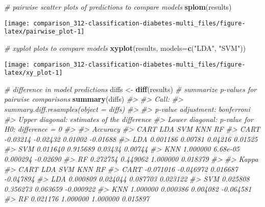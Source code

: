 \documentclass[]{book}
\newenvironment{Shaded}{\begin{snugshade}}{\end{snugshade}}
\newcommand{\CommentTok}[1]{\textcolor[rgb]{0.56,0.35,0.01}{\textit{#1}}}
\newcommand{\DataTypeTok}[1]{\textcolor[rgb]{0.13,0.29,0.53}{#1}}
\newcommand{\KeywordTok}[1]{\textcolor[rgb]{0.13,0.29,0.53}{\textbf{#1}}}
\newcommand{\NormalTok}[1]{#1}
\newcommand{\StringTok}[1]{\textcolor[rgb]{0.31,0.60,0.02}{#1}}
\begin{document}
\begin{Shaded}
\begin{Highlighting}[]
\CommentTok{# pairwise scatter plots of predictions to compare models}
\KeywordTok{splom}\NormalTok{(results)}
\end{Highlighting}
\end{Shaded}

\begin{center}\texttt{[image: comparison\_312-classification-diabetes-multi\_files/figure-latex/pairwise\_plot-1]} \end{center}

\begin{Shaded}
\begin{Highlighting}[]
\CommentTok{# xyplot plots to compare models}
\KeywordTok{xyplot}\NormalTok{(results, }\DataTypeTok{models=}\KeywordTok{c}\NormalTok{(}\StringTok{"LDA"}\NormalTok{, }\StringTok{"SVM"}\NormalTok{))}
\end{Highlighting}
\end{Shaded}

\begin{center}\texttt{[image: comparison\_312-classification-diabetes-multi\_files/figure-latex/xy\_plot-1]} \end{center}

\begin{Shaded}
\begin{Highlighting}[]
\CommentTok{# difference in model predictions}
\NormalTok{diffs <-}\StringTok{ }\KeywordTok{diff}\NormalTok{(results)}
\CommentTok{# summarize p-values for pairwise comparisons}
\KeywordTok{summary}\NormalTok{(diffs)}
\CommentTok{#> }
\CommentTok{#> Call:}
\CommentTok{#> summary.diff.resamples(object = diffs)}
\CommentTok{#> }
\CommentTok{#> p-value adjustment: bonferroni }
\CommentTok{#> Upper diagonal: estimates of the difference}
\CommentTok{#> Lower diagonal: p-value for H0: difference = 0}
\CommentTok{#> }
\CommentTok{#> Accuracy }
\CommentTok{#>      CART     LDA      SVM      KNN      RF      }
\CommentTok{#> CART          -0.03214 -0.02432  0.01002 -0.01688}
\CommentTok{#> LDA  0.001186           0.00781  0.04216  0.01525}
\CommentTok{#> SVM  0.011640 0.915689           0.03434  0.00744}
\CommentTok{#> KNN  1.000000 6.68e-05 0.000294          -0.02690}
\CommentTok{#> RF   0.272754 0.449062 1.000000 0.018379         }
\CommentTok{#> }
\CommentTok{#> Kappa }
\CommentTok{#>      CART     LDA       SVM       KNN       RF       }
\CommentTok{#> CART          -0.071016 -0.046972  0.016687 -0.047894}
\CommentTok{#> LDA  0.000809            0.024044  0.087703  0.023122}
\CommentTok{#> SVM  0.025808 0.356273             0.063659 -0.000922}
\CommentTok{#> KNN  1.000000 0.000386  0.004082            -0.064581}
\CommentTok{#> RF   0.021176 1.000000  1.000000  0.015897}
\end{Highlighting}
\end{Shaded}
\end{document}
